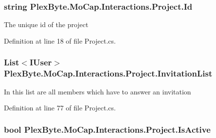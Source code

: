 \subsubsection[{\texorpdfstring{Id}{Id}}]{\setlength{\rightskip}{0pt plus 5cm}string Plex\+Byte.\+Mo\+Cap.\+Interactions.\+Project.\+Id\hspace{0.3cm}{\ttfamily [get]}}\hypertarget{class_plex_byte_1_1_mo_cap_1_1_interactions_1_1_project_ad78c8f3d9736e6c9dccb1d0e0a0748f7}{}\label{class_plex_byte_1_1_mo_cap_1_1_interactions_1_1_project_ad78c8f3d9736e6c9dccb1d0e0a0748f7}


The unique id of the project 



Definition at line 18 of file Project.\+cs.

\subsubsection[{\texorpdfstring{Invitation\+List}{InvitationList}}]{\setlength{\rightskip}{0pt plus 5cm}List$<$I\+User$>$ Plex\+Byte.\+Mo\+Cap.\+Interactions.\+Project.\+Invitation\+List\hspace{0.3cm}{\ttfamily [get]}}\hypertarget{class_plex_byte_1_1_mo_cap_1_1_interactions_1_1_project_afedd69d0ca0662b9c1b03431339b129d}{}\label{class_plex_byte_1_1_mo_cap_1_1_interactions_1_1_project_afedd69d0ca0662b9c1b03431339b129d}


In this list are all members which have to answer an invitation 



Definition at line 77 of file Project.\+cs.

\subsubsection[{\texorpdfstring{Is\+Active}{IsActive}}]{\setlength{\rightskip}{0pt plus 5cm}bool Plex\+Byte.\+Mo\+Cap.\+Interactions.\+Project.\+Is\+Active\hspace{0.3cm}{\ttfamily [get]}}\hypertarget{class_plex_byte_1_1_mo_cap_1_1_interactions_1_1_project_ac9b00a5a3ce25337a513dfc9c1f6a380}{}\label{class_plex_byte_1_1_mo_cap_1_1_interactions_1_1_project_ac9b00a5a3ce25337a513dfc9c1f6a380}


